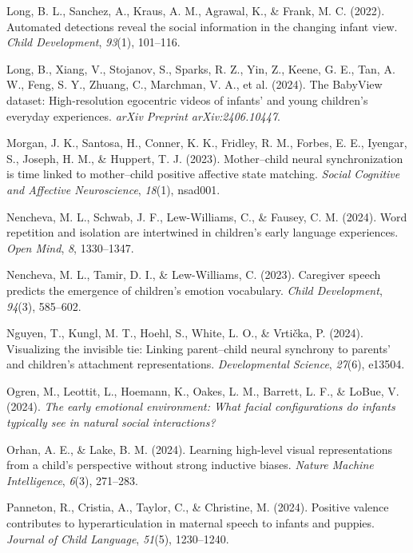 \documentclass[10pt, letterpaper]{article}
\begin{document}
\begin{CSLReferences}{1}{0}
Long, B. L., Sanchez, A., Kraus, A. M., Agrawal, K., \& Frank, M. C.
(2022). Automated detections reveal the social information in the
changing infant view. \emph{Child Development}, \emph{93}(1), 101--116.

Long, B., Xiang, V., Stojanov, S., Sparks, R. Z., Yin, Z., Keene, G. E.,
Tan, A. W., Feng, S. Y., Zhuang, C., Marchman, V. A., et al. (2024). The
BabyView dataset: High-resolution egocentric videos of infants' and
young children's everyday experiences. \emph{arXiv Preprint
arXiv:2406.10447}.

Morgan, J. K., Santosa, H., Conner, K. K., Fridley, R. M., Forbes, E.
E., Iyengar, S., Joseph, H. M., \& Huppert, T. J. (2023). Mother--child
neural synchronization is time linked to mother--child positive
affective state matching. \emph{Social Cognitive and Affective
Neuroscience}, \emph{18}(1), nsad001.

Nencheva, M. L., Schwab, J. F., Lew-Williams, C., \& Fausey, C. M.
(2024). Word repetition and isolation are intertwined in children's
early language experiences. \emph{Open Mind}, \emph{8}, 1330--1347.

Nencheva, M. L., Tamir, D. I., \& Lew-Williams, C. (2023). Caregiver
speech predicts the emergence of children's emotion vocabulary.
\emph{Child Development}, \emph{94}(3), 585--602.

Nguyen, T., Kungl, M. T., Hoehl, S., White, L. O., \& Vrtička, P.
(2024). Visualizing the invisible tie: Linking parent--child neural
synchrony to parents' and children's attachment representations.
\emph{Developmental Science}, \emph{27}(6), e13504.

Ogren, M., Leottit, L., Hoemann, K., Oakes, L. M., Barrett, L. F., \&
LoBue, V. (2024). \emph{The early emotional environment: What facial
configurations do infants typically see in natural social interactions?}

Orhan, A. E., \& Lake, B. M. (2024). Learning high-level visual
representations from a child's perspective without strong inductive
biases. \emph{Nature Machine Intelligence}, \emph{6}(3), 271--283.

Panneton, R., Cristia, A., Taylor, C., \& Christine, M. (2024). Positive
valence contributes to hyperarticulation in maternal speech to infants
and puppies. \emph{Journal of Child Language}, \emph{51}(5), 1230--1240.


\end{CSLReferences}
\end{document}
